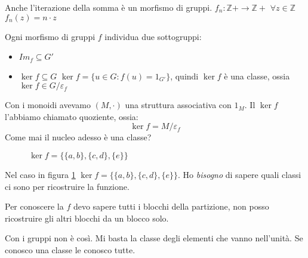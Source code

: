 Anche l'iterazione della somma \`e un morfismo di gruppi. $f_n : \mathbb{Z} + \to \mathbb{Z} + $ $\forall z \in \mathbb{Z}$ $f_n(z) = n \cdot z$

Ogni morfismo di gruppi $f$ individua due sottogruppi:
\begin{itemize}
    \item $Im_f \subseteq G'$
    \item $\ker f \subseteq G$ $\ker f = \{ u \in G : f(u) = 1_{G'}\}$, quindi $\ker f$ \`e una classe, ossia $\ker f \in G / \varepsilon_f$
\end{itemize}

Con i monoidi avevamo $(M, \cdot)$ una struttura associativa con $1_M$. Il $\ker f$ l'abbiamo chiamato quoziente, ossia:
\[
\ker f = M / \varepsilon_f
\]
Come mai il nucleo adesso \`e una classe? 

\begin{figure}[ht]
\centering
{}
\caption{\label{fig:esempio_funzione}$\ker f = \{ \{a, b \}, \{ c, d \}, \{ e \}\}$ }
\end{figure}

Nel caso in figura \ref{fig:esempio_funzione} $\ker f = \{ \{a, b \}, \{ c, d \}, \{ e \}\}$. Ho \textit{bisogno} di sapere quali classi ci sono per ricostruire la funzione.

Per conoscere la $f$ devo sapere tutti i blocchi della partizione, non posso ricostruire gli altri blocchi da un blocco solo.

Con i gruppi non \`e cos\`i. Mi basta la classe degli elementi che vanno nell'unit\`a. Se conosco una classe le conosco tutte.

